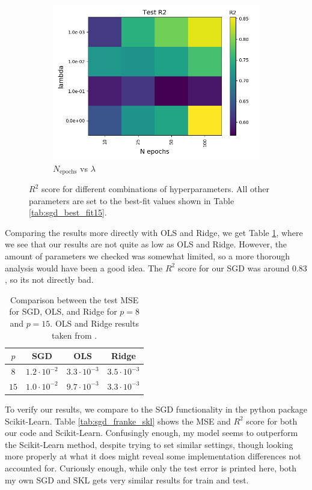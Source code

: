 \documentclass[a4paper]{article}
\newcommand{\Nepochs}{N_{\text{epochs}}}
\begin{document}
\begin{figure}[H]
\begin{subfigure}{0.49\textwidth}
    \includegraphics[scale=0.45]{../figures/task_a/test_p15/heatmap_test_p15_lr_constant_Nhyp4434_R2_n_epochs_lambdas.png}
    \caption{$\Nepochs$ vs $\lambda$}
  \end{subfigure}
  \caption{$R^2$ score for different combinations of hyperparameters. All other parameters are set to the best-fit values shown in Table \ref{tab:sgd_best_fit15}.}
  \label{fig:sgd_4}
\end{figure}
Comparing the results more directly with OLS and Ridge, we get Table \ref{tab:sgd_franke_compare}, where we see that our results are not quite as low as OLS and Ridge. However, the amount of parameters we checked was somewhat limited, so a more thorough analysis would have been a good idea. The $R^2$ score for our SGD was around $0.83$, so its not directly bad.
\begin{table}[H]
  \centering
  \caption{Comparison between the test MSE for SGD, OLS, and Ridge for $p=8$ and $p=15$. OLS and Ridge results taken from \cite{Github1}.}
  \label{tab:sgd_franke_compare}
  \begin{tabular}{c|c|c|c}
    \hline\hline
    $p$ & SGD & OLS & Ridge \\\hline
	$8$ & $1.2\cdot10^{-2}$ & $3.3\cdot10^{-3}$ & $3.5\cdot10^{-3}$\\
	$15$& $1.0\cdot10^{-2}$ & $9.7\cdot10^{-3}$ & $3.3\cdot10^{-3}$
    \end{tabular}
\end{table}
To verify our results, we compare to the SGD functionality in the python package Scikit-Learn. Table \ref{tab:sgd_franke_skl} shows the MSE and $R^2$ score for both our code and Scikit-Learn. Confusingly enough, my model seems to outperform the Scikit-Learn method, despite trying to set similar settings, though looking more properly at what it does might reveal some implementation differences not accounted for. Curiously enough, while only the test error is printed here, both my own SGD and SKL gets very similar results for train and test.
\end{document}
